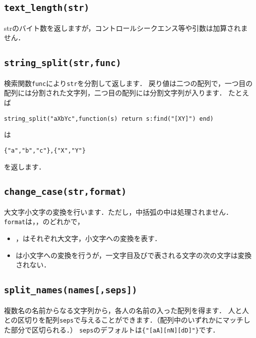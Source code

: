 \documentclass[a4paper]{ltjsarticle}
\newcommand{\luafunc}[1]{\texttt{#1}}
\newcommand*{\luavar}[1]{\texttt{#1}}
\begin{document}
\subsection{\luafunc{text\_length(str)}}
strのバイト数を返しますが，コントロールシークエンス等や引数は加算されません．

\subsection{\luafunc{string\_split(str,func)}}
検索関数\luavar{func}により\luavar{str}を分割して返します．
戻り値は二つの配列で，一つ目の配列には分割された文字列，二つ目の配列には分割文字列が入ります．
たとえば
\begin{lstlisting}
string_split("aXbYc",function(s) return s:find("[XY]") end)
\end{lstlisting}
は
\begin{lstlisting}
{"a","b","c"},{"X","Y"}
\end{lstlisting}
を返します．


\subsection{\luafunc{change\_case(str,format)}}
大文字小文字の変換を行います．ただし，中括弧の中は処理されません．
\luavar{format}は，，のどれかで，
\begin{itemize}
\item {}，はそれぞれ大文字，小文字への変換を表す．
\item {}は小文字への変換を行うが，一文字目及び\luastring{: *}で表される文字の次の文字は変換されない．
\end{itemize}


\subsection{\luafunc{split\_names(names[,seps])}}
複数名の名前からなる文字列から，各人の名前の入った配列を得ます．
人と人との区切りを配列\luavar{seps}で与えることができます．（配列中のいずれかにマッチした部分で区切られる．）
\luavar{seps}のデフォルトは\verb|{"[aA][nN][dD]"}|です．
\end{document}
